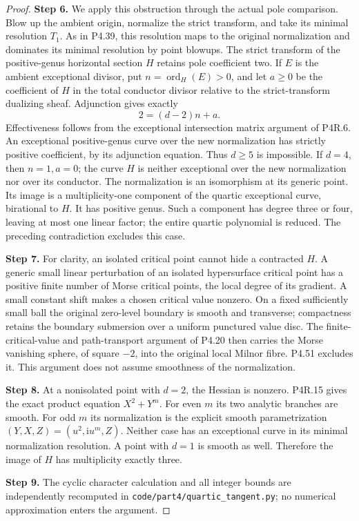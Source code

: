 \begin{proof}
\noindent\textbf{Step 6.} We apply this obstruction through the actual pole
comparison. Blow up the ambient origin, normalize
the strict transform, and take its minimal
resolution $T_1$. As in P4.39, this resolution maps
to the original normalization and dominates its
minimal resolution by point blowups. The strict
transform of the positive-genus horizontal section
$H$ retains pole coefficient two. If $E$ is the
ambient exceptional divisor, put
$n=\operatorname{ord}_H(E)>0$, and let $a\ge0$
be the coefficient of $H$ in the total conductor
divisor relative to the strict-transform dualizing
sheaf. Adjunction gives exactly
\[
                          2=(d-2)n+a.                     \tag{4.52d}
\]
Effectiveness follows from the exceptional
intersection matrix argument of P4R.6. An
exceptional positive-genus curve over the new
normalization has strictly positive coefficient,
by its adjunction equation. Thus $d\ge5$ is
impossible. If $d=4$, then $n=1,a=0$; the curve
$H$ is neither exceptional over the new
normalization nor over its conductor. The
normalization is an isomorphism at its generic
point. Its image is a multiplicity-one component
of the quartic exceptional curve, birational to
$H$. It has positive genus. Such a component has
degree three or four, leaving at most one linear
factor; the entire quartic polynomial is reduced.
The preceding contradiction excludes this case.

\noindent\textbf{Step 7.} For clarity, an isolated critical point cannot
hide a contracted $H$. A generic small linear
perturbation of an isolated hypersurface critical
point has a positive finite number of Morse
critical points, the local degree of its gradient.
A small constant shift makes a chosen critical
value nonzero. On a fixed sufficiently small ball
the original zero-level boundary is smooth and
transverse; compactness retains the boundary
submersion over a uniform punctured value disc.
The finite-critical-value and path-transport
argument of P4.20 then carries the Morse
vanishing sphere, of square $-2$, into the
original local Milnor fibre. P4.51 excludes it.
This argument does not assume smoothness of the
normalization.

\noindent\textbf{Step 8.} At a nonisolated point with $d=2$, the Hessian is
nonzero. P4R.15 gives the exact product equation
$X^2+Y^m$. For even $m$ its two analytic branches
are smooth. For odd $m$ its normalization is the
explicit smooth parametrization
$(Y,X,Z)=(u^2,\mathrm i u^m,Z)$.
Neither case has an exceptional curve in its
minimal normalization resolution. A point with
$d=1$ is smooth as well. Therefore the image of
$H$ has multiplicity exactly three.

\noindent\textbf{Step 9.} The cyclic character calculation and all integer
bounds are independently recomputed in
\texttt{code/part4/quartic\_tangent.py}; no numerical
approximation enters the argument.
\end{proof}



